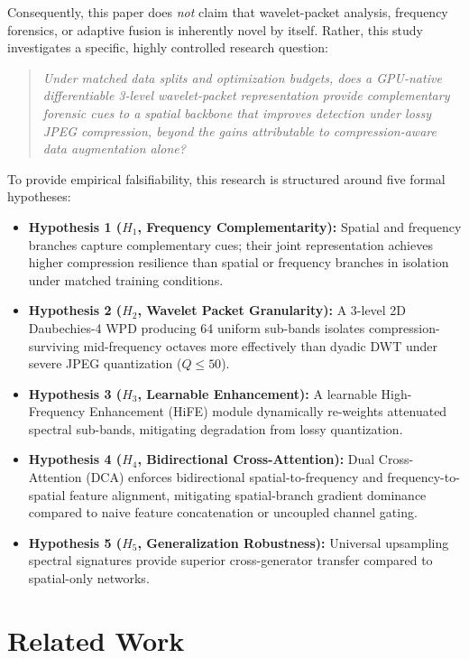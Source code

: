 \documentclass[11pt,a4paper]{article}
\begin{document}
Consequently, this paper does \textit{not} claim that wavelet-packet analysis, frequency forensics, or adaptive fusion is inherently novel by itself. Rather, this study investigates a specific, highly controlled research question:
\begin{quote}
\textit{Under matched data splits and optimization budgets, does a GPU-native differentiable 3-level wavelet-packet representation provide complementary forensic cues to a spatial backbone that improves detection under lossy JPEG compression, beyond the gains attributable to compression-aware data augmentation alone?}
\end{quote}

To provide empirical falsifiability, this research is structured around five formal hypotheses:
\begin{itemize}
    \item \textbf{Hypothesis 1 ($H_1$, Frequency Complementarity):} Spatial and frequency branches capture complementary cues; their joint representation achieves higher compression resilience than spatial or frequency branches in isolation under matched training conditions.
    \item \textbf{Hypothesis 2 ($H_2$, Wavelet Packet Granularity):} A 3-level 2D Daubechies-4 WPD producing 64 uniform sub-bands isolates compression-surviving mid-frequency octaves more effectively than dyadic DWT under severe JPEG quantization ($Q \le 50$).
    \item \textbf{Hypothesis 3 ($H_3$, Learnable Enhancement):} A learnable High-Frequency Enhancement (HiFE) module dynamically re-weights attenuated spectral sub-bands, mitigating degradation from lossy quantization.
    \item \textbf{Hypothesis 4 ($H_4$, Bidirectional Cross-Attention):} Dual Cross-Attention (DCA) enforces bidirectional spatial-to-frequency and frequency-to-spatial feature alignment, mitigating spatial-branch gradient dominance compared to naive feature concatenation or uncoupled channel gating.
    \item \textbf{Hypothesis 5 ($H_5$, Generalization Robustness):} Universal upsampling spectral signatures provide superior cross-generator transfer compared to spatial-only networks.
\end{itemize}

\section{Related Work}
\label{sec:related}
\end{document}
